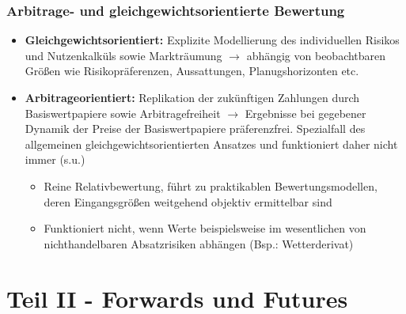 \subsubsection{Arbitrage- und gleichgewichtsorientierte Bewertung}
\begin{itemize}
	\item \textbf{Gleichgewichtsorientiert:} Explizite Modellierung des individuellen Risikos und Nutzenkalküls sowie Markträumung \(\rightarrow\) abhängig von beobachtbaren Größen wie Risikopräferenzen, Aussattungen, Planugshorizonten etc.
	\item \textbf{Arbitrageorientiert:} Replikation der zukünftigen Zahlungen durch Basiswertpapiere sowie Arbitragefreiheit \(\rightarrow\) Ergebnisse bei gegebener Dynamik der Preise der Basiswertpapiere präferenzfrei. Spezialfall des allgemeinen gleichgewichtsorientierten Ansatzes und funktioniert daher nicht immer (s.u.)
	\begin{itemize}
		\item Reine Relativbewertung, führt zu praktikablen Bewertungsmodellen, deren Eingangsgrößen weitgehend objektiv ermittelbar sind
		\item Funktioniert nicht, wenn Werte beispielsweise im wesentlichen von nichthandelbaren Absatzrisiken abhängen (Bsp.: Wetterderivat)
	\end{itemize}
\end{itemize}



\section{Teil II - Forwards und Futures}

